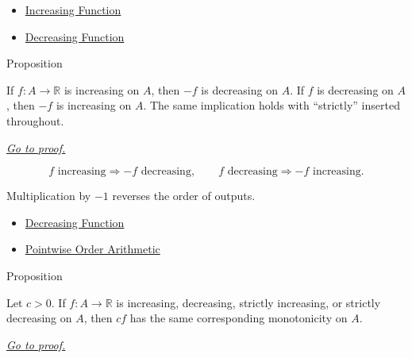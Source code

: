 \begin{dependencies}
\begin{itemize}
  \item \hyperref[def:function-increasing]{Increasing Function}
  \item \hyperref[def:function-decreasing]{Decreasing Function}
\end{itemize}
\end{dependencies}

\begin{propositionbox}{Proposition}
\begin{proposition}
\label{prop:negation-reverses-monotonicity}
If \(f:A\to\mathbb{R}\) is increasing on \(A\), then \(-f\) is decreasing
on \(A\).  If \(f\) is decreasing on \(A\), then \(-f\) is increasing on
\(A\).  The same implication holds with ``strictly'' inserted throughout.

\smallskip\noindent
\hyperref[prf:negation-reverses-monotonicity]{\textit{Go to proof.}}
\end{proposition}
\end{propositionbox}

\begin{remark*}
\[
  f\text{ increasing}\Rightarrow -f\text{ decreasing},
  \qquad
  f\text{ decreasing}\Rightarrow -f\text{ increasing}.
\]
\end{remark*}

\begin{remark*}[Interpretation]
Multiplication by \(-1\) reverses the order of outputs.
\end{remark*}

\begin{dependencies}
\begin{itemize}
  \item \hyperref[def:function-decreasing]{Decreasing Function}
  \item \hyperref[thm:pointwise-order-arithmetic]{Pointwise Order Arithmetic}
\end{itemize}
\end{dependencies}

\begin{propositionbox}{Proposition}
\begin{proposition}
\label{prop:positive-scalar-multiples-preserve-monotonicity}
Let \(c>0\).  If \(f:A\to\mathbb{R}\) is increasing, decreasing, strictly
increasing, or strictly decreasing on \(A\), then \(cf\) has the same
corresponding monotonicity on \(A\).

\smallskip\noindent
\hyperref[prf:positive-scalar-multiples-preserve-monotonicity]{\textit{Go to proof.}}
\end{proposition}
\end{propositionbox}

